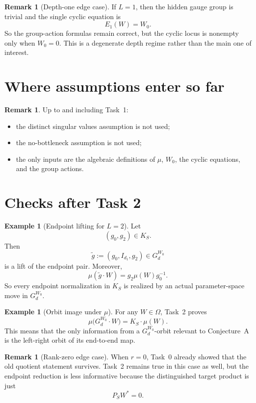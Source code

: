 \documentclass{article}
\theoremstyle{definition}
\newtheorem{remark}[theorem]{Remark}
\newtheorem{example}[theorem]{Example}
\begin{document}
\begin{remark}[Depth-one edge case]
If $L=1$, then the hidden gauge group is trivial and the single cyclic equation is
\[
E_1(W)=W_0.
\]
So the group-action formulas remain correct, but the cyclic locus is nonempty only when $W_0=0$. This is a degenerate depth regime rather than the main one of interest.
\end{remark}

\section{Where assumptions enter so far}

\begin{remark}
Up to and including Task~1:
\begin{itemize}
\item the distinct singular values assumption is not used;
\item the no-bottleneck assumption is not used;
\item the only inputs are the algebraic definitions of $\mu$, $W_0$, the cyclic equations, and the group actions.
\end{itemize}
\end{remark}

\section{Checks after Task 2}

\begin{example}[Endpoint lifting for $L=2$]
Let
\[
(g_0,g_2)\in K_S.
\]
Then
\[
\widetilde g:=(g_0,I_{d_1},g_2)\in G_d^{W_0}
\]
is a lift of the endpoint pair. Moreover,
\[
\mu(\widetilde g\cdot W)=g_2\mu(W)g_0^{-1}.
\]
So every endpoint normalization in $K_S$ is realized by an actual parameter-space move in $G_d^{W_0}$.
\end{example}

\begin{example}[Orbit image under $\mu$]
For any $W\in \Omega$, Task~2 proves
\[
\mu\bigl(G_d^{W_0}\cdot W\bigr)=K_S\cdot \mu(W).
\]
This means that the only information from a $G_d^{W_0}$-orbit relevant to Conjecture~A is the left-right orbit of its end-to-end map.
\end{example}

\begin{remark}[Rank-zero edge case]
When $r=0$, Task~0 already showed that the old quotient statement survives. Task~2 remains true in this case as well, but the endpoint reduction is less informative because the distinguished target product is just
\[
P_SW^\ast=0.
\]
\end{remark}
\end{document}
